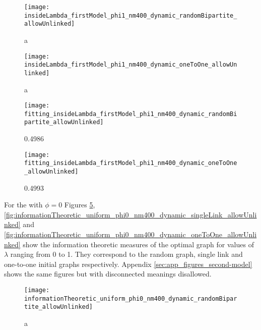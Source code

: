 \begin{figure}
  \centering
  \texttt{[image: insideLambda\_firstModel\_phi1\_nm400\_dynamic\_randomBipartite\_allowUnlinked]}
  \caption{a}
  \label{fig:insideLambda_firstModel_phi1_nm400_dynamic_randomBipartite_allowUnlinked}
\end{figure}

\begin{figure}
  \centering
  \texttt{[image: insideLambda\_firstModel\_phi1\_nm400\_dynamic\_oneToOne\_allowUnlinked]}
  \caption{a}
  \label{fig:insideLambda_firstModel_phi1_nm400_dynamic_oneToOne_allowUnlinked}
\end{figure}

\begin{figure}
  \centering
  \texttt{[image: fitting\_insideLambda\_firstModel\_phi1\_nm400\_dynamic\_randomBipartite\_allowUnlinked]}
  \caption{0.4986}
  \label{fig:fitting_insideLambda_firstModel_phi1_nm400_dynamic_randomBipartite_allowUnlinked}
\end{figure}

\begin{figure}
  \centering
  \texttt{[image: fitting\_insideLambda\_firstModel\_phi1\_nm400\_dynamic\_oneToOne\_allowUnlinked]}
  \caption{0.4993}
  \label{fig:fitting_insideLambda_firstModel_phi1_nm400_dynamic_oneToOne_allowUnlinked}
\end{figure}





For the \secondmodel{} with $\phi=0$ Figures  \ref{fig:informationTheoretic_uniform_phi0_nm400_dynamic_randomBipartite_allowUnlinked},  \ref{fig:informationTheoretic_uniform_phi0_nm400_dynamic_singleLink_allowUnlinked} and  \ref{fig:informationTheoretic_uniform_phi0_nm400_dynamic_oneToOne_allowUnlinked} show the information theoretic measures of the optimal graph for values of $\lambda$ ranging from 0 to 1.
They correspond to the random graph, single link and one-to-one initial graphs respectively.
Appendix \ref{sec:app_figures_second-model} shows the same figures but with disconnected meanings disallowed.

\begin{figure}
  \centering
  \texttt{[image: informationTheoretic\_uniform\_phi0\_nm400\_dynamic\_randomBipartite\_allowUnlinked]}
  \caption{a}
  \label{fig:informationTheoretic_uniform_phi0_nm400_dynamic_randomBipartite_allowUnlinked}
\end{figure}

